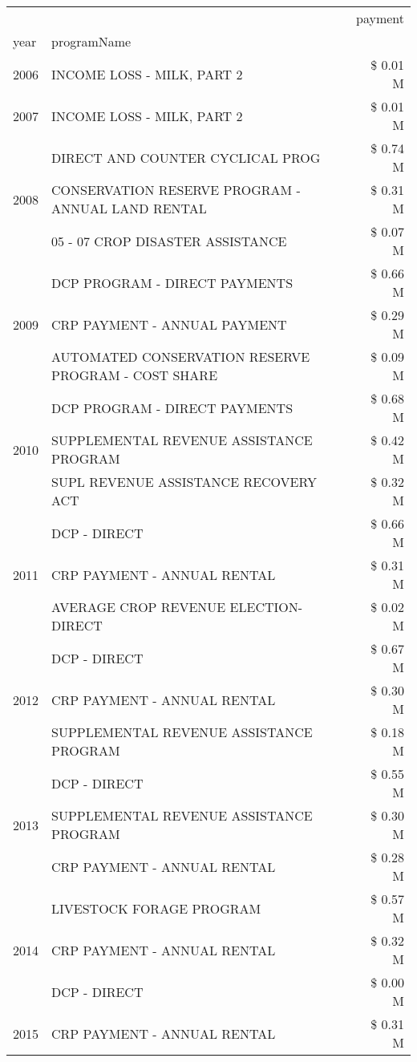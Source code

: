 \begin{tabular}{llr}
\toprule
 &  & payment \\
year & programName &  \\
\midrule
2006 & INCOME LOSS - MILK, PART 2 & \$ 0.01 M \\
\cline{1-3}
2007 & INCOME LOSS - MILK, PART 2 & \$ 0.01 M \\
\cline{1-3}
\multirow[t]{3}{*}{2008} & DIRECT AND COUNTER CYCLICAL PROG & \$ 0.74 M \\
 & CONSERVATION RESERVE PROGRAM - ANNUAL LAND RENTAL & \$ 0.31 M \\
 & 05 - 07 CROP DISASTER ASSISTANCE & \$ 0.07 M \\
\cline{1-3}
\multirow[t]{3}{*}{2009} & DCP PROGRAM - DIRECT PAYMENTS & \$ 0.66 M \\
 & CRP PAYMENT - ANNUAL PAYMENT & \$ 0.29 M \\
 & AUTOMATED CONSERVATION RESERVE PROGRAM - COST SHARE & \$ 0.09 M \\
\cline{1-3}
\multirow[t]{3}{*}{2010} & DCP PROGRAM - DIRECT PAYMENTS & \$ 0.68 M \\
 & SUPPLEMENTAL REVENUE ASSISTANCE PROGRAM & \$ 0.42 M \\
 & SUPL REVENUE ASSISTANCE RECOVERY ACT & \$ 0.32 M \\
\cline{1-3}
\multirow[t]{3}{*}{2011} & DCP - DIRECT & \$ 0.66 M \\
 & CRP PAYMENT - ANNUAL RENTAL & \$ 0.31 M \\
 & AVERAGE CROP REVENUE ELECTION-DIRECT & \$ 0.02 M \\
\cline{1-3}
\multirow[t]{3}{*}{2012} & DCP - DIRECT & \$ 0.67 M \\
 & CRP PAYMENT - ANNUAL RENTAL & \$ 0.30 M \\
 & SUPPLEMENTAL REVENUE ASSISTANCE PROGRAM & \$ 0.18 M \\
\cline{1-3}
\multirow[t]{3}{*}{2013} & DCP - DIRECT & \$ 0.55 M \\
 & SUPPLEMENTAL REVENUE ASSISTANCE PROGRAM & \$ 0.30 M \\
 & CRP PAYMENT - ANNUAL RENTAL & \$ 0.28 M \\
\cline{1-3}
\multirow[t]{3}{*}{2014} & LIVESTOCK FORAGE PROGRAM & \$ 0.57 M \\
 & CRP PAYMENT - ANNUAL RENTAL & \$ 0.32 M \\
 & DCP - DIRECT & \$ 0.00 M \\
\cline{1-3}
\multirow[t]{3}{*}{2015} & CRP PAYMENT - ANNUAL RENTAL & \$ 0.31 M \\

\end{tabular}
